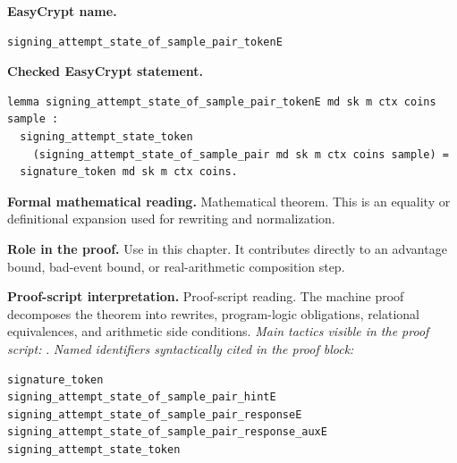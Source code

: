 \begin{formaltheorem}
\noindent\textbf{EasyCrypt name.}
\begin{lstlisting}[language=EasyCrypt,basicstyle=\ttfamily\scriptsize]
signing_attempt_state_of_sample_pair_tokenE
\end{lstlisting}
\noindent\textbf{Checked EasyCrypt statement.}
\begin{lstlisting}[language=EasyCrypt,basicstyle=\ttfamily\scriptsize]
lemma signing_attempt_state_of_sample_pair_tokenE md sk m ctx coins sample :
  signing_attempt_state_token
    (signing_attempt_state_of_sample_pair md sk m ctx coins sample) =
  signature_token md sk m ctx coins.
\end{lstlisting}
\noindent\textbf{Formal mathematical reading.}
Mathematical theorem. This is an equality or definitional expansion used for rewriting and normalization.

\noindent\textbf{Role in the proof.}
Use in this chapter. It contributes directly to an advantage bound, bad-event bound, or real-arithmetic composition step.

\noindent\textbf{Proof-script interpretation.}
Proof-script reading. The machine proof decomposes the theorem into rewrites, program-logic obligations, relational equivalences, and arithmetic side conditions.
\emph{Main tactics visible in the proof script:} .
\emph{Named identifiers syntactically cited in the proof block:}
\begin{lstlisting}[language=EasyCrypt,basicstyle=\ttfamily\scriptsize]
signature_token
signing_attempt_state_of_sample_pair_hintE
signing_attempt_state_of_sample_pair_responseE
signing_attempt_state_of_sample_pair_response_auxE
signing_attempt_state_token
\end{lstlisting}

\end{formaltheorem}

